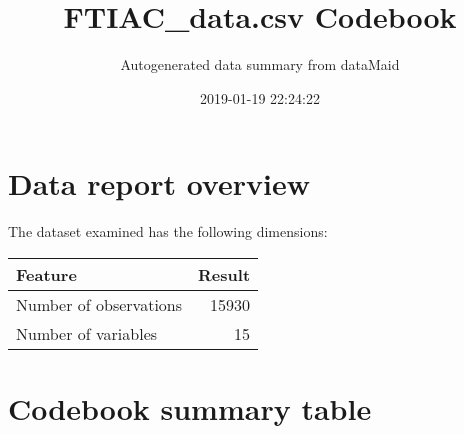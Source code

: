 \documentclass[]{article}
\title{FTIAC\_data.csv Codebook}
\subtitle{Autogenerated data summary from dataMaid}
\author{}
\date{2019-01-19 22:24:22}
\begin{document}
\maketitle

\section{Data report overview}\label{data-report-overview}

The dataset examined has the following dimensions:

\begin{longtable}[]{@{}lr@{}}
\toprule
\begin{minipage}[b]{0.33\columnwidth}\raggedright\strut
Feature\strut
\end{minipage} & \begin{minipage}[b]{0.10\columnwidth}\raggedleft\strut
Result\strut
\end{minipage}\tabularnewline
\midrule
\endhead
\begin{minipage}[t]{0.33\columnwidth}\raggedright\strut
Number of observations\strut
\end{minipage} & \begin{minipage}[t]{0.10\columnwidth}\raggedleft\strut
15930\strut
\end{minipage}\tabularnewline
\begin{minipage}[t]{0.33\columnwidth}\raggedright\strut
Number of variables\strut
\end{minipage} & \begin{minipage}[t]{0.10\columnwidth}\raggedleft\strut
15\strut
\end{minipage}\tabularnewline
\bottomrule
\end{longtable}

\section{Codebook summary table}\label{codebook-summary-table}
\end{document}
